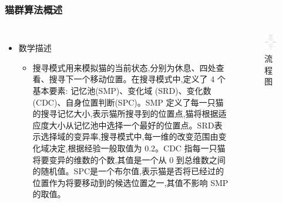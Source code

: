 \begin{frame}
	\frametitle{猫群算法概述}
	\begin{columns}
		\begin{itemize}
			\item {数学描述}
				\begin{itemize}
					\item {搜寻模式用来模拟猫的当前状态,分别为休息、四处查看、搜寻下一个移动位置。在搜寻模式中,定义了 4 个基本要素: 记忆池(SMP)、变化域 (SRD)、变化数(CDC)、自身位置判断(SPC)。SMP 定义了每一只猫的搜寻记忆大小,表示猫所搜寻到的位置点,猫将根据适应度大小从记忆池中选择一个最好的位置点。SRD表示选择域的变异率,搜寻模式中,每一维的改变范围由变化域决定,根据经验一般取值为 0.2。CDC 指每一只猫将要变异的维数的个数,其值是一个从 0 到总维数之间的随机值。SPC是一个布尔值,表示猫是否将已经过的位置作为将要移动到的候选位置之一,其值不影响 SMP 的取值。}		
				\end{itemize}
		\end{itemize}
		\begin{figure}[p]
			\centering
			\includegraphics[width=6cm]{pic/cat4.png}
			\caption{流程图}
		\end{figure}
	\end{columns}
\end{frame}

